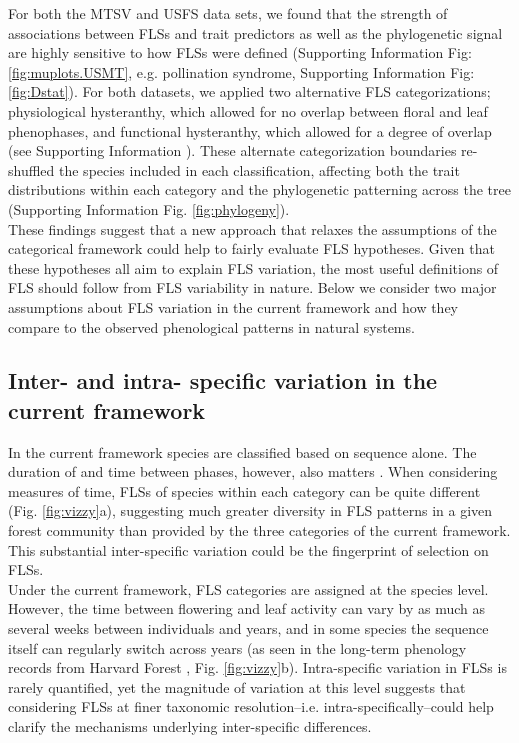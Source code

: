 \documentclass[11pt]{article}
\begin{document}
\noindent For both the MTSV and USFS data sets, we found that the strength of associations between FLSs and trait predictors as well as the phylogenetic signal are highly sensitive to how FLSs were defined (Supporting Information Fig: \ref{fig:muplots.USMT}, e.g. pollination syndrome, Supporting Information Fig: \ref{fig:Dstat}). For both datasets, we applied two alternative FLS categorizations; physiological hysteranthy, which allowed for no overlap between floral and leaf phenophases, and functional hysteranthy, which allowed for a degree of overlap (see Supporting Information ). These alternate categorization boundaries re-shuffled the species included in each classification, affecting both the trait distributions within each category and the phylogenetic patterning across the tree (Supporting Information Fig. \ref{fig:phylogeny}).\\ 

\noindent These findings suggest that a new approach that relaxes the assumptions of the categorical framework could help to fairly evaluate FLS hypotheses. Given that these hypotheses all aim to explain FLS variation, the most useful definitions of FLS should follow from FLS variability in nature. Below we consider two major assumptions about FLS variation in the current framework and how they compare to the observed phenological patterns in natural systems.\\

\subsection*{Inter- and intra- specific variation in the current framework}
\noindent In the current framework species are classified based on sequence alone. The duration of and time between phases, however, also matters \citep{Inouye2019}. When considering measures of time, FLSs of species within each category can be quite different (Fig. \ref{fig:vizzy}a), suggesting much greater diversity in FLS patterns in a given forest community than provided by the three categories of the current framework. This substantial inter-specific variation could be the fingerprint of selection on FLSs.\\ 

\noindent Under the current framework, FLS categories are assigned at the species level. However, the time between flowering and leaf activity can vary by as much as several weeks between individuals and years, and in some species the sequence itself can regularly switch across years (as seen in the long-term phenology records from  Harvard Forest \citep{OKeefe2015}, Fig. \ref{fig:vizzy}b). Intra-specific variation in FLSs is rarely quantified, yet the magnitude of variation at this level suggests that considering FLSs at finer taxonomic resolution--i.e. intra-specifically--could help clarify the mechanisms underlying inter-specific differences.\\
\end{document}
